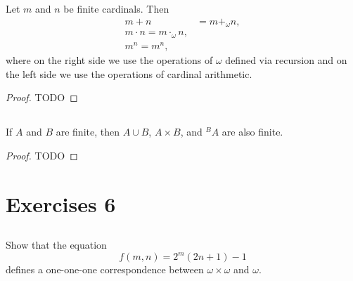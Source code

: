 \documentclass{report}
\begin{document}
  Let $m$ and $n$ be finite cardinals.
  Then
    \begin{align*}
      m + n & = m +_\omega n, \\
      m \cdot n = m \cdot_\omega n, \\
      m^n = m^n,
    \end{align*}
    where on the right side we use the operations of $\omega$ defined via
    recursion and on the left side we use the operations of cardinal arithmetic.

  \begin{proof}
    TODO
  \end{proof}

\subsection{}%

  If $A$ and $B$ are finite, then $A \cup B$, $A \times B$, and $^B{A}$ are also
    finite.

  \begin{proof}
    TODO
  \end{proof}

\section{Exercises 6}%

\subsection{}%

  Show that the equation $$f(m, n) = 2^m(2n + 1) - 1$$ defines a one-one-one
    correspondence between $\omega \times \omega$ and $\omega$.
\end{document}
